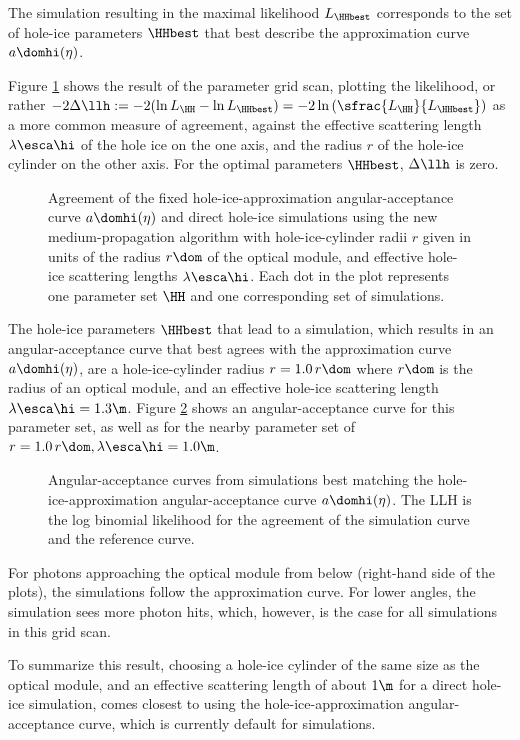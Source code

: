 The simulation resulting in the maximal likelihood $L_\HHbest$ corresponds to the set of hole-ice parameters $\HHbest$ that best describe the approximation curve $a\domhi(\eta)$.

Figure \ref{fig:AWa5aiCh} shows the result of the parameter grid scan, plotting the likelihood, or rather $-2\Delta\llh:= -2(\ln L_\HH - \ln L_\HHbest) = -2 \ln \left(\sfrac{L_\HH}{L_\HHbest}\right)$ as a more common measure of agreement, against the effective scattering length $\lambda\esca\hi$ of the hole ice on the one axis, and the radius $r$ of the hole-ice cylinder on the other axis.
For the optimal parameters $\HHbest$, $\Delta\llh$ is zero.

\begin{figure}[htbp]
  \caption{Agreement of the fixed hole-ice-approximation angular-acceptance curve $a\domhi(\eta)$ and direct hole-ice simulations using the new \clsim medium-propagation algorithm with hole-ice-cylinder radii $r$ given in units of the radius $r\dom$ of the optical module, and effective hole-ice scattering lengths $\lambda\esca\hi$. Each dot in the plot represents one parameter set $\HH$ and one corresponding set of simulations.}
  \label{fig:AWa5aiCh}
\end{figure}

The hole-ice parameters $\HHbest$ that lead to a simulation, which results in an angular-acceptance curve that best agrees with the approximation curve $a\domhi(\eta)$, are a hole-ice-cylinder radius $r = 1.0\,r\dom$ where $r\dom$ is the radius of an optical module, and an effective hole-ice scattering length $\lambda\esca\hi = 1.3\m$. Figure \ref{fig:weShir8i} shows an angular-acceptance curve for this parameter set, as well as for the nearby parameter set of $r=1.0\,r\dom, \lambda\esca\hi = 1.0\m$.

\begin{figure}[htbp]
  \hfill
  \caption{Angular-acceptance curves from simulations best matching the hole-ice-approximation angular-acceptance curve $a\domhi(\eta)$. The LLH is the log binomial likelihood for the agreement of the simulation curve and the reference curve.}
  \label{fig:weShir8i}
\end{figure}

For photons approaching the optical module from below (right-hand side of the plots), the simulations follow the approximation curve. For lower angles, the simulation sees more photon hits, which, however, is the case for all simulations in this grid scan.

To summarize this result, choosing a hole-ice cylinder of the same size as the optical module, and an effective scattering length of about $1\m$ for a direct hole-ice simulation, comes closest to using the hole-ice-approximation angular-acceptance curve, which is currently default for \clsim simulations.

